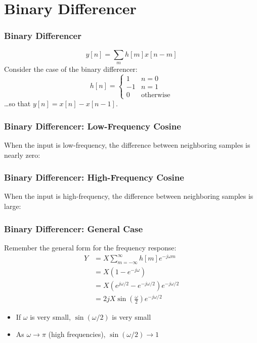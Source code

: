 \documentclass{beamer}
\begin{document}
\section{Binary Differencer}
\setcounter{subsection}{1}


\begin{frame}
  \frametitle{Binary Differencer}

  \begin{displaymath}
    y[n]=\sum_m h[m]x[n-m]
  \end{displaymath}
  Consider the case of the binary differencer:
  \begin{displaymath}
    h[n]=\left\{\begin{array}{ll}
    1 & n=0\\
    -1 & n=1\\
    0 & \mbox{otherwise}
    \end{array}\right.
  \end{displaymath}
  \ldots so that $y[n]=x[n]-x[n-1]$.
\end{frame}

\begin{frame}
  \frametitle{Binary Differencer: Low-Frequency Cosine}

  When the input is low-frequency, the difference between neighboring
  samples is nearly zero:
  \centerline{}
\end{frame}

\begin{frame}
  \frametitle{Binary Differencer: High-Frequency Cosine}

  When the input is high-frequency, the difference between neighboring
  samples is large:
  \centerline{}
\end{frame}

\begin{frame}
  \frametitle{Binary Differencer: General Case}

  Remember the general form for the frequency response:
  \begin{align*}
    Y &= X\sum_{m=-\infty}^\infty h[m]e^{-j\omega m}\\
    &= X\left(1-e^{-j\omega}\right)\\
    &= X\left(e^{j\omega/2}-e^{-j\omega/2}\right)e^{-j\omega/2}\\
    &= 2jX\sin\left(\frac{\omega}{2}\right)e^{-j\omega/2}
  \end{align*}
  \begin{itemize}
  \item If $\omega$ is very small, $\sin(\omega/2)$ is very small
  \item As $\omega\rightarrow\pi$ (high frequencies), $\sin(\omega/2)\rightarrow 1$
  \end{itemize}
\end{frame}
\end{document}
